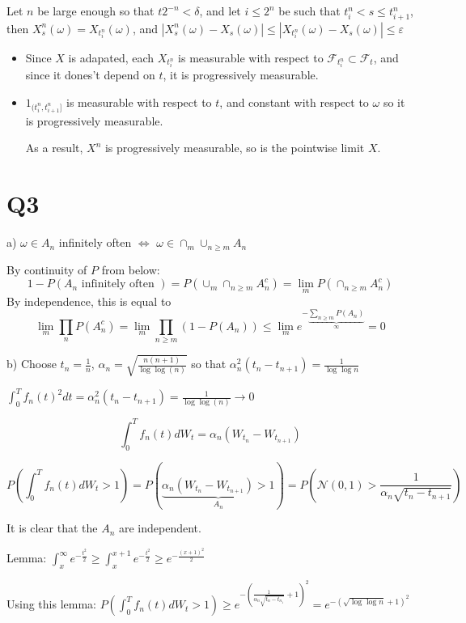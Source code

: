 \documentclass[11pt]{article}
\begin{document}
Let \(n\) be large enough so that \(t2^{-n} < \delta\), and let \(i \le 2^n\) be such that \(t_i^n < s \le t_{i+1}^n\), then
\(X_s^n(\omega) = X_{t_i^n}(\omega)\), and \(|X_s^n(\omega) - X_s(\omega)| \le |X_{t_i^n}(\omega) - X_s(\omega)| \le \varepsilon\)

\begin{itemize}
\item Since \(X\) is adapated, each \(X_{t_i^n}\) is measurable with respect to \(\mathcal F_{t_i^n} \subset \mathcal F_t\), and since it dones't depend on \(t\), it is progressively measurable.
\item \(1_{(t_i^n, t_{i+1}^n]}\) is measurable with respect to \(t\), and constant with respect to \(\omega\) so it is progressively measurable.

As a result, \(X^n\) is progressively measurable, so is the pointwise limit \(X\).
\end{itemize}

\section*{Q3}
\label{sec:orgheadline6}
a)
\(\omega \in A_n\) infinitely often \(\iff\) \(\omega \in \cap_{m} \cup_{n \ge m} A_n\)

By continuity of \(P\) from below:
$$1 - P(A_n \text{ infinitely often }) = P(\cup_m \cap_{n \ge m} A_n^c) = \lim_m P(\cap_{n \ge m} A_n^c)$$
By independence, this is equal to 
$$\lim_m \prod_n P(A_n^c) = \lim_m \prod_{n \ge m} (1 - P(A_n)) \le \lim_m e^{-\underbrace{\sum_{n \ge m} P(A_n)}_{\infty}} = 0$$

b)
Choose  \(t_n = \frac1n\), \(\alpha_n = \sqrt{\frac{n(n+1)}{\log \log(n)}}\) so that \(\alpha_n^2 (t_n - t_{n+1}) = \frac{1}{\log \log n}\)

\(\int_0^T f_n(t)^2 dt= \alpha_n^2 (t_n - t_{n+1}) = \frac{1}{\log \log(n)} \rightarrow 0\)

$$\int_0^T f_n(t) dW_t = \alpha_n ( W_{t_n} - W_{t_{n+1}})$$

$$P(\int_0^T f_n(t) dW_t > 1)  = P(\underbrace{\alpha_n (W_{t_n} - W_{t_{n+1}} ) > 1}_{A_n}) = P(\mathcal N(0, 1) > \frac{1}{\alpha_n\sqrt{t_n - t_{n+1}}})$$

It is clear that the \(A_n\) are independent.

Lemma: \(\int_x^{\infty} e^{-\frac{t^2}{2}} \ge \int_x^{x+1} e^{-\frac{t^2}{2}} \ge e^{-\frac{(x+1)^2}{2}}\)

Using this lemma:
\(P(\int_0^T f_n(t) dW_t > 1)  \ge e^{-(\frac{1}{\alpha_n \sqrt{t_n - t_{n_1}}} + 1)^2} = e^{-( \sqrt{\log \log n} + 1)^2}\)
\end{document}

